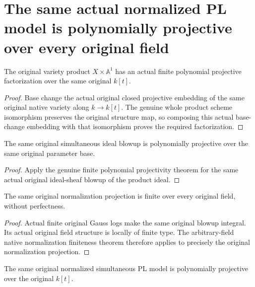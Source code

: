 \section{The same actual normalized PL model is polynomially projective over every original field}
\begin{lemma}\label{lem:pl-native-product-projective-factorization}
The original variety product $X\times\mathbb A^1$ has an actual finite polynomial projective factorization over the same original $k[t]$.
\leanok
\end{lemma}
\begin{proof}
Base change the actual original closed projective embedding of the same original native variety along $k\to k[t]$. The genuine whole product scheme isomorphism preserves the original structure map, so composing this actual base-change embedding with that isomorphism proves the required factorization.
\end{proof}
\begin{lemma}\label{lem:pl-simultaneous-blowup-projective-factorization}
The same original simultaneous ideal blowup is polynomially projective over the same original parameter base.
\leanok
\end{lemma}
\begin{proof}Apply the genuine finite polynomial projectivity theorem for the same actual original ideal-sheaf blowup of the product ideal.\end{proof}
\begin{lemma}\label{lem:pl-normalized-projection-finite-any-field}
The same original normalization projection is finite over every original field, without perfectness.
\leanok
\end{lemma}
\begin{proof}
Actual finite original Gauss logs make the same original blowup integral. Its actual original field structure is locally of finite type. The arbitrary-field native normalization finiteness theorem therefore applies to precisely the original normalization projection.
\end{proof}
\begin{theorem}\label{thm:pl-normalized-polynomial-projectivity}
The same original normalized simultaneous PL model is polynomially projective over the original $k[t]$.
\leanok
\end{theorem}
